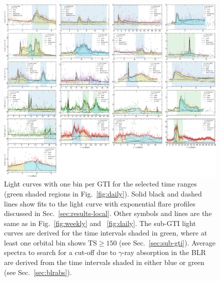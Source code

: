 \documentclass[twocolumn,linenumbers]{aastex62}
\newcommand{\gray}{$\gamma$-ray\xspace}
\begin{document}
\begin{figure}
    \centering
    \includegraphics[width = .99\linewidth]{figures/lcfithop_orbit_all_maxiter2_fsys0p00_addcomp0_comb.pdf}
    \caption{ Light curves with one bin per GTI for the selected time ranges (green shaded regions in Fig.~\ref{fig:daily}). Solid black and dashed lines show fits to the light curve with exponential flare profiles discussed in Sec.~\ref{sec:results-local}. Other symbols and lines are the same as in Fig.~\ref{fig:weekly} and ~\ref{fig:daily}.
    The sub-GTI light curves are derived for the time intervals shaded in green, where at least one orbital bin shows $\mathrm{TS}\geqslant 150$ (see Sec.~\ref{sec:sub-gti}). 
    Average spectra to search for a cut-off due to \gray absorption in the BLR are derived from the time intervals shaded in either blue or green (see Sec.~\ref{sec:blrabs}).
    }
    \label{fig:gti}
\end{figure}
\end{document}
